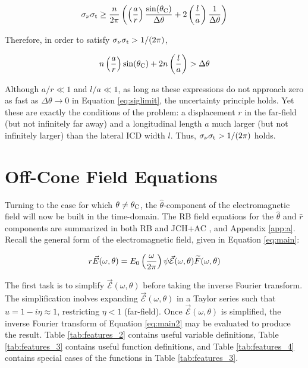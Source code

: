 \documentclass[amsmath,amssymb,aps,prd,10pt,twocolumn]{revtex4}
\begin{document}
\begin{equation}
\sigma_{\rm \nu} \sigma_{\rm t} \geq \frac{n}{2\pi} \left( \left(\frac{a}{r}\right) \frac{\sin(\theta_{\rm C})}{\Delta \theta} + 2 \left( \frac{l}{a} \right) \frac{1}{\Delta \theta} \right)
\end{equation}

Therefore, in order to satisfy $\sigma_{\rm \nu} \sigma_{\rm t} > 1/(2\pi)$,

\begin{equation}
n\left(\frac{a}{r}\right)\sin(\theta_{\rm C}) + 2 n \left( \frac{l}{a} \right) > \Delta\theta \label{eq:siglimit}
\end{equation}

Although $a/r \ll 1$ and $l/a \ll 1$, as long as these expressions do not approach zero as fast as $\Delta\theta \to 0$ in Equation \ref{eq:siglimit}, the uncertainty principle holds.  Yet these are exactly the conditions of the problem: a displacement $r$ in the far-field (but not infinitely far away) and a longitudinal length $a$ much larger (but not infinitely larger) than the lateral ICD width $l$.  Thus, $\sigma_{\rm \nu} \sigma_{\rm t} > 1/(2\pi)$ holds.

\section{Off-Cone Field Equations}
\label{sec:ofc}

Turning to the case for which $\theta \neq \theta_{\rm C}$, the $\hat{\theta}$-component of the electromagnetic field  will now be built in the time-domain.  The RB field equations for the $\hat{\theta}$ and $\hat{r}$ components are summarized in both RB and JCH+AC \cite{10.1103/physrevd.65.016003,10.1016/j.astropartphys.2017.03.008}, and Appendix \ref{app:a}.  Recall the general form of the electromagnetic field, given in Equation \ref{eq:main}:

\begin{equation}
r\vec{E}(\omega,\theta) = E_{\rm 0} \left( \frac{\omega}{2\pi} \right) \psi \vec{\mathcal{E}}(\omega,\theta) \widetilde{F}(\omega,\theta) \label{eq:main2}
\end{equation}

The first task is to simplify $\vec{\mathcal{E}}(\omega,\theta)$ before taking the inverse Fourier transform. The simplification inolves expanding $\vec{\mathcal{E}}(\omega,\theta)$ in a Taylor series such that $u = 1-i\eta \approx 1$, restricting $\eta < 1$ (far-field).  Once $\vec{\mathcal{E}}(\omega,\theta)$ is simplified, the inverse Fourier transform of Equation \ref{eq:main2} may be evaluated to produce the result.  Table \ref{tab:features_2} contains useful variable definitions, Table \ref{tab:features_3} contains useful function definitions, and Table \ref{tab:features_4} contains special cases of the functions in Table \ref{tab:features_3}.
\end{document}
